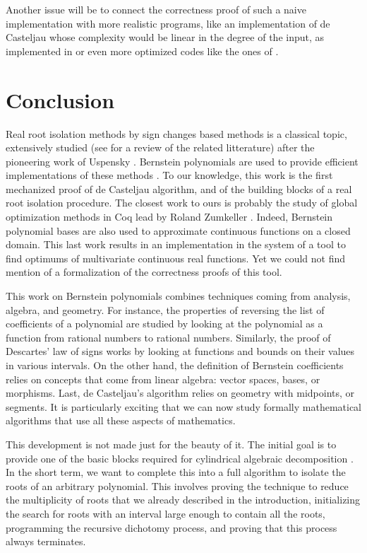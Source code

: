 \documentclass{mscs}
\begin{document}
Another issue will be to connect the correctness proof of such a
naive implementation with more realistic programs, like an
implementation of de Casteljau whose complexity would be
linear in the degree of the input, as
implemented in \cite{cadcoq} or even more optimized codes like the
ones of \cite{mourrainetal}.

\section{Conclusion}

Real root isolation methods by sign changes based methods is a
classical topic, extensively studied (see \cite{rouillieretal} for a
review of the related litterature) after the pioneering work of
Uspensky \cite{uspensky}. Bernstein polynomials are used to provide
efficient implementations of these methods
\cite{mourrainetal, rouillieretal}.  To our knowledge, this work is
the first mechanized proof of de Casteljau algorithm, and of the
building blocks of a real root isolation procedure. The closest work
to ours is probably the study of global optimization methods in Coq
lead by Roland Zumkeller \cite{zumkellerphd}. Indeed, Bernstein
polynomial bases are also used to approximate continuous functions on a
closed domain. This last work results in an implementation in the
\Coq{} system of a tool to find optimums of multivariate continuous real
functions. Yet we could not find mention of a formalization of the
correctness proofs of this tool.

This work on Bernstein polynomials combines techniques coming from
analysis, algebra, and geometry. For instance, the properties of
reversing the list of coefficients of a polynomial are studied by
looking at the polynomial as a function from rational numbers to
rational numbers. Similarly, the proof of Descartes' law of signs
works by looking at functions and bounds on their values in various
intervals. On the other hand, the definition of Bernstein coefficients
relies on concepts that come from linear algebra: vector spaces,
bases, or morphisms. Last, de Casteljau's algorithm relies on geometry
with midpoints, or segments. It is particularly exciting that we can
now study formally mathematical algorithms that use all these aspects
of mathematics.

This development is not made just for the beauty of it. The initial
goal is to provide one of the basic blocks required for cylindrical
algebraic decomposition \cite{bpr, cadcoq}. In the short term, we
want to complete this
into a full algorithm to isolate the roots of an arbitrary
polynomial. This involves proving the technique to reduce the
multiplicity of roots that we already described in the introduction,
initializing the search for roots with an interval large enough to
contain all the roots, programming the recursive dichotomy process,
and proving that this process always terminates.
\end{document}
